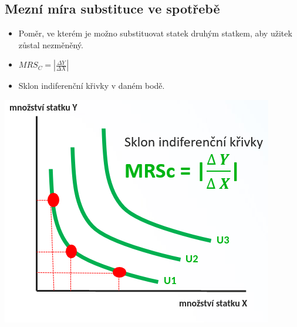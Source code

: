 \subsection{Mezní míra substituce ve spotřebě}
\begin{itemize}
    \item Poměr, ve kterém je možno substituovat statek druhým statkem, aby užitek zůstal nezměněný.
    \item $MRS_C=|\frac{\Delta Y}{\Delta X}|$
    \item Sklon indiferenční křivky v daném bodě.
\end{itemize}
\includegraphics{images/mrsc.png}

